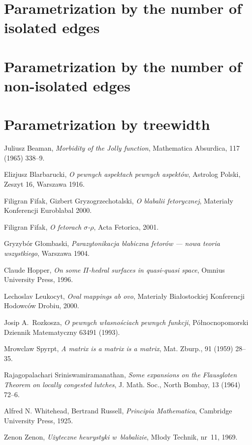 \documentclass[en]{pracamgr}
\begin{document}
\section{Parametrization by the number of isolated edges}

\section{Parametrization by the number of non-isolated edges}

\section{Parametrization by treewidth}

\begin{thebibliography}{99}

 Juliusz Beaman, \textit{Morbidity of the Jolly
    function}, Mathematica Absurdica, 117 (1965) 338--9.

 Elizjusz Blarbarucki, \textit{O pewnych
    aspektach pewnych aspektów}, Astrolog Polski, Zeszyt 16, Warszawa
  1916.

 Filigran Fifak, Gizbert Gryzogrzechotalski,
  \textit{O blabalii fetorycznej}, Materiały Konferencji Euroblabal
  2000.

 Filigran Fifak, \textit{O fetorach
    $\sigma$-$\rho$}, Acta Fetorica, 2001.

 Gryzybór Głombaski, \textit{Parazytonikacja
    blabiczna fetorów --- nowa teoria wszystkiego}, Warszawa 1904.

 Claude Hopper, \textit{On some $\Pi$-hedral
    surfaces in quasi-quasi space}, Omnius University Press, 1996.

 Lechoslav Leukocyt, \textit{Oval mappings ab ovo},
  Materiały Białostockiej Konferencji Hodowców Drobiu, 2000.

 Josip A.~Rozkosza, \textit{O pewnych własnościach
    pewnych funkcji}, Północnopomorski Dziennik Matematyczny 63491
  (1993).

 Mrowclaw Spyrpt, \textit{A matrix is a matrix
    is a matrix}, Mat. Zburp., 91 (1959) 28--35.

 Rajagopalachari Sriniswamiramanathan,
  \textit{Some expansions on the Flausgloten Theorem on locally
    congested lutches}, J. Math.  Soc., North Bombay, 13 (1964) 72--6.

 Alfred N. Whitehead, Bertrand Russell,
  \textit{Principia Mathematica}, Cambridge University Press, 1925.

 Zenon Zenon, \textit{Użyteczne heurystyki
    w~blabalizie}, Młody Technik, nr~11, 1969.

\end{thebibliography}
\end{document}
